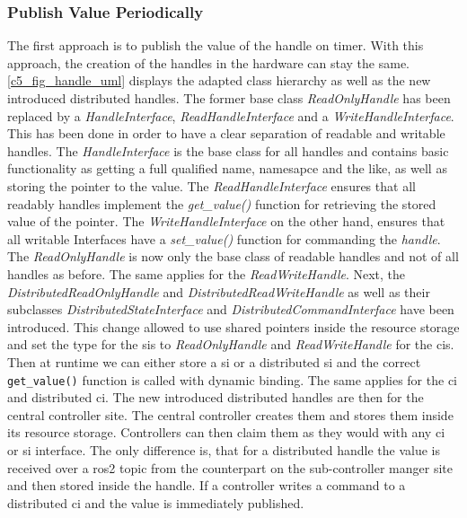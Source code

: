 \subsubsection*{Publish Value Periodically}
The first approach is to publish the value of the \gls{handle} on timer. With this approach, the creation of the \glspl{handle} in the hardware can stay the same. \autoref{c5_fig_handle_uml} displays the adapted class hierarchy as well as the new introduced distributed \glspl{handle}. The former base class \textit{ReadOnlyHandle} has been replaced by a \textit{HandleInterface}, \textit{ReadHandleInterface} and a \textit{WriteHandleInterface}. This has been done in order to have a clear separation of readable and writable \glspl{handle}. The \textit{HandleInterface} is the base class for all \glspl{handle} and contains basic functionality as getting a full qualified name, namesapce and the like, as well as storing the pointer to the value. The \textit{ReadHandleInterface} ensures that all readably \glspl{handle} implement the \textit{get\_value()} function for retrieving the stored value of the pointer. The \textit{WriteHandleInterface} on the other hand, ensures that all writable Interfaces have a \textit{set\_value()} function for commanding the \textit{handle}. \newline
The \textit{ReadOnlyHandle} is now only the base class of readable \glspl{handle} and not of all \glspl{handle} as before. The same applies for the \textit{ReadWriteHandle}. Next, the \textit{DistributedReadOnlyHandle} and \textit{DistributedReadWriteHandle} as well as their subclasses \textit{DistributedStateInterface} and \textit{DistributedCommandInterface} have been introduced. This change allowed to use shared pointers inside the resource storage and set the type for the \glspl{si} to \textit{ReadOnlyHandle} and \textit{ReadWriteHandle} for the \glspl{ci}. Then at runtime we can either store a \gls{si} or a distributed \gls{si} and the correct \lstset{language=C++,basicstyle=\small\ttfamily}\lstinline{get_value()} function is called with dynamic binding. The same applies for the \gls{ci} and distributed \gls{ci}. \newline
The new introduced distributed \glspl{handle} are then for the central controller site. The central controller creates them and stores them inside its resource storage. Controllers can then claim them as they would with any \gls{ci} or \gls{si} interface. The only difference is, that for a distributed \gls{handle} the value is received over a \gls{ros2} topic from the counterpart on the sub-controller manger site and then stored inside the \gls{handle}. If a controller writes a command to a distributed \gls{ci} and the value is immediately published. \newline
